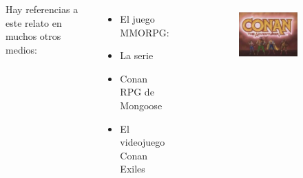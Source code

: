 \begin{frame}{}
 \begin{columns}
 Hay referencias a este relato en muchos otros medios:
\begin{itemize}
 \item El juego MMORPG: 
 \item La serie 
 \item Conan RPG de Mongoose
 \item El videojuego Conan Exiles
\end{itemize}
\begin{figure}[htp]
 \centering
 \begin{subfigure}[b]{0.3\textwidth}
   \includegraphics[width=\textwidth]{img/otros/Conantheadventurerlogo}
 \end{subfigure}
~
 \begin{subfigure}[b]{0.3\textwidth}

\end{subfigure}
\end{figure}
\end{columns}
\end{frame}
